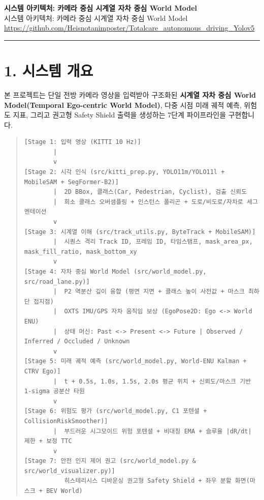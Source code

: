 \documentclass[10.5pt,a4paper]{article}
\begin{document}
\begin{center}
{\LARGE\bfseries 시스템 아키텍처: 카메라 중심 시계열 자차 중심 World Model}\\[6pt]
{\normalsize\color{gray} 시스템 아키텍처: 카메라 중심 시계열 자차 중심 World Model}\\[4pt]
{\small\href{https://github.com/Heisnotanimposter/Totalcare_autonomous_driving_Yolov5}{https://github.com/Heisnotanimposter/Totalcare\_autonomous\_driving\_Yolov5}}
\end{center}
\vspace{4pt}
\hrule
\vspace{8pt}

\section{1. 시스템 개요}

본 프로젝트는 단일 전방 카메라 영상을 입력받아 구조화된 \textbf{시계열 자차 중심 World Model(Temporal Ego-centric World Model)}, 다중 시점 미래 궤적 예측, 위험도 지표, 그리고 권고형 Safety Shield 출력을 생성하는 7단계 파이프라인을 구현합니다.


\begin{quote}\begin{footnotesize}\begin{verbatim}
[Stage 1: 입력 영상 (KITTI 10 Hz)]
        |
        v
[Stage 2: 시각 인식 (src/kitti_prep.py, YOLO11m/YOLO11l + MobileSAM + SegFormer-B2)]
        |  2D BBox, 클래스(Car, Pedestrian, Cyclist), 검출 신뢰도
        |  희소 클래스 오버샘플링 + 인스턴스 폴리곤 + 도로/비도로/자차로 세그멘테이션
        v
[Stage 3: 시계열 이해 (src/track_utils.py, ByteTrack + MobileSAM)]
        |  시퀀스 격리 Track ID, 프레임 ID, 타임스탬프, mask_area_px, mask_fill_ratio, mask_bottom_xy
        v
[Stage 4: 자차 중심 World Model (src/world_model.py, src/road_lane.py)]
        |  P2 역분산 깊이 융합 (평면 지면 + 클래스 높이 사전값 + 마스크 최하단 접지점)
        |  OXTS IMU/GPS 자차 움직임 보상 (EgoPose2D: Ego <-> World ENU)
        |  상태 머신: Past <-> Present <-> Future | Observed / Inferred / Occluded / Unknown
        v
[Stage 5: 미래 궤적 예측 (src/world_model.py, World-ENU Kalman + CTRV Ego)]
        |  t + 0.5s, 1.0s, 1.5s, 2.0s 평균 위치 + 신뢰도/마스크 기반 1-sigma 공분산 타원
        v
[Stage 6: 위험도 평가 (src/world_model.py, C1 포텐셜 + CollisionRiskSmoother)]
        |  부드러운 시그모이드 위험 포텐셜 + 비대칭 EMA + 슬루율 |dR/dt| 제한 + 보정 TTC
        v
[Stage 7: 안전 인지 제어 권고 (src/world_model.py & src/world_visualizer.py)]
           히스테리시스 디바운싱 권고형 Safety Shield + 좌우 분할 화면(마스크 + BEV World)
\end{verbatim}\end{footnotesize}\end{quote}
\end{document}
